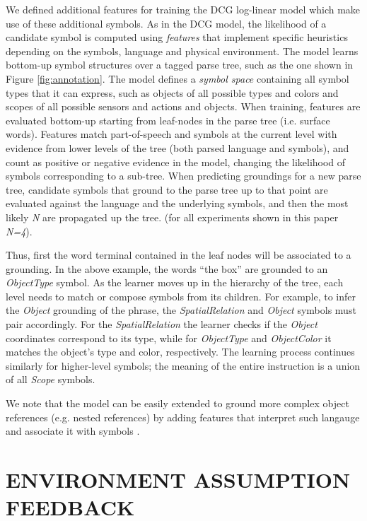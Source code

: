 \documentclass[letterpaper]{article} %
\begin{document}
We defined additional features for training the DCG log-linear model which make use of these additional symbols. As in the DCG model, the likelihood of a candidate symbol is computed using \textit{features} that implement specific heuristics depending on the symbols, language and physical environment. The model learns bottom-up symbol structures over a tagged parse tree, such as the one shown in Figure \ref{fig:annotation}. The model defines a \textit{symbol space} containing all symbol types that it can express, such as objects of all possible types and colors and scopes of all possible sensors and actions and objects.
When training, features are evaluated bottom-up starting from leaf-nodes in the parse tree (i.e. surface words). Features match part-of-speech and symbols at the current level with evidence from lower levels of the tree (both parsed language and symbols), and count as positive or negative evidence in the model, changing the likelihood of symbols corresponding to a sub-tree.
When predicting groundings for a new parse tree, candidate symbols that ground to the parse tree up to that point are evaluated against the language and the underlying symbols, and then the most likely \textit{N} are propagated up the tree. (for all experiments shown in this paper \textit{N=4}).

Thus, first the word terminal contained in the leaf nodes will be associated to a grounding. In the above example, the words ``the box'' are grounded to an \textit{ObjectType} symbol. As the learner moves up in the hierarchy of the tree, each level needs to match or compose symbols from its children. For example, to infer the \textit{Object} grounding of the phrase, the \textit{SpatialRelation} and \textit{Object} symbols must pair accordingly. For the \textit{SpatialRelation} the learner checks if the \textit{Object} coordinates correspond to its type, while for \textit{ObjectType} and \textit{ObjectColor} it matches the object's type and color, respectively. The learning process continues similarly for higher-level symbols; the meaning of the entire instruction is a union of all \textit{Scope} symbols.

We note that the model can be easily extended to ground more complex object references (e.g. nested references) by adding features that interpret such langauge and associate it with symbols \cite{chung2015performance}.

\section{ENVIRONMENT ASSUMPTION FEEDBACK}\label{sec:assumptions}
\end{document}
